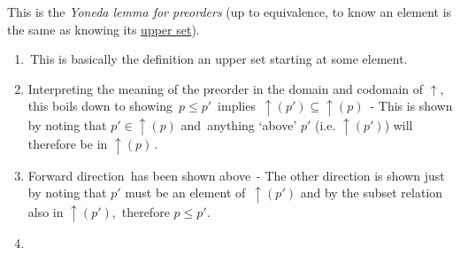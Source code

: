 This is the \emph{Yoneda lemma for preorders} (up to equivalence, to know an element is the same as knowing its \href{doc/1 math/Seven Sketches in Compositionality/1 Generative Effects/3 Preorders/Upper set}{upper set}).
  \begin{enumerate}
    \item \,This is basically the definition an upper set starting at some element.\,
    \item Interpreting the meaning of the preorder in the domain and codomain of $\uparrow$, this boils down to showing \,$p \leq p'$\, implies \,$\uparrow(p') \subseteq \uparrow(p)$\,
          - This is shown by noting that $p' \in \uparrow(p)$ and \,anything `above' $p'$ (i.e. $\uparrow(p')$) will therefore be in $\uparrow(p)$\,.
    \item Forward direction \,has been shown above\,
          - The other direction is shown just by noting that $p\prime$ must be an element of \,$\uparrow(p\prime)$ and by the subset relation also in $\uparrow(p')$,\, therefore $p \leq p'$.
    \item \,  \,
  \end{enumerate}